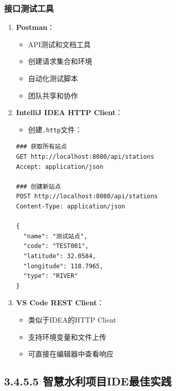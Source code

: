 \subsubsection{接口测试工具}\label{ux63a5ux53e3ux6d4bux8bd5ux5de5ux5177}

\begin{enumerate}
\def\labelenumi{\arabic{enumi}.}
\tightlist
\item
  \textbf{Postman}：

  \begin{itemize}
  \tightlist
  \item
    API测试和文档工具
  \item
    创建请求集合和环境
  \item
    自动化测试脚本
  \item
    团队共享和协作
  \end{itemize}
\item
  \textbf{IntelliJ IDEA HTTP Client}：

  \begin{itemize}
  \tightlist
  \item
    创建\passthrough{\lstinline!.http!}文件：
  \end{itemize}

\begin{lstlisting}
### 获取所有站点
GET http://localhost:8080/api/stations
Accept: application/json

### 创建新站点
POST http://localhost:8080/api/stations
Content-Type: application/json

{
  "name": "测试站点",
  "code": "TEST001",
  "latitude": 32.0584,
  "longitude": 118.7965,
  "type": "RIVER"
}
\end{lstlisting}
\item
  \textbf{VS Code REST Client}：

  \begin{itemize}
  \tightlist
  \item
    类似于IDEA的HTTP Client
  \item
    支持环境变量和文件上传
  \item
    可直接在编辑器中查看响应
  \end{itemize}
\end{enumerate}

\subsection{3.4.5.5
智慧水利项目IDE最佳实践}\label{ux667aux6167ux6c34ux5229ux9879ux76eeideux6700ux4f73ux5b9eux8df5}

